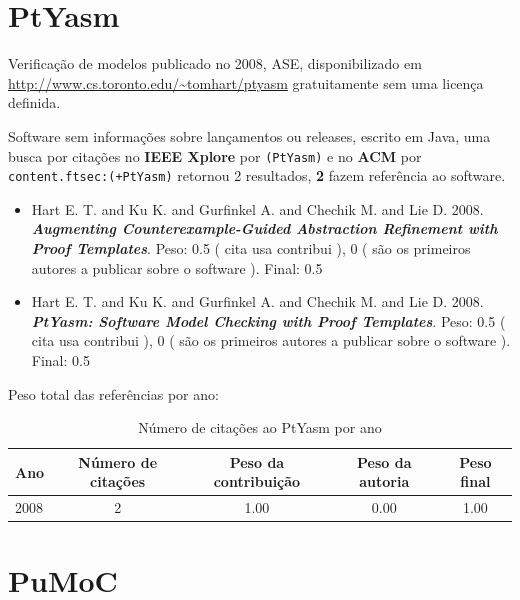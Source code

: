 \section{PtYasm}

Verificação de modelos
publicado no 2008, ASE,
disponibilizado em \url{http://www.cs.toronto.edu/~tomhart/ptyasm}
gratuitamente
sem uma licença definida.

Software sem informações sobre lançamentos ou releases,
escrito em Java,
uma busca por citações no {\bf IEEE Xplore} por
\texttt{(PtYasm)}
e no {\bf ACM} por
\texttt{content.ftsec:(+PtYasm)}
retornou
2 resultados,
{\bf 2} fazem referência ao software.

\begin{itemize}
\item Hart E. T. and Ku K. and Gurfinkel A. and Chechik M. and Lie D.
      2008.
        \textbf{\textit{ Augmenting Counterexample-Guided Abstraction Refinement with Proof Templates}}.
      Peso:
      0.5 (
          cita
          usa
          contribui
      ),
      0 (
são os primeiros autores a publicar sobre o software
      ).
      Final:
      0.5

\item Hart E. T. and Ku K. and Gurfinkel A. and Chechik M. and Lie D.
      2008.
        \textbf{\textit{ PtYasm: Software Model Checking with Proof Templates}}.
      Peso:
      0.5 (
          cita
          usa
          contribui
      ),
      0 (
são os primeiros autores a publicar sobre o software
      ).
      Final:
      0.5

\end{itemize}

Peso total das referências por ano:

\begin{table}[h]
\caption{Número de citações ao PtYasm por ano}
\centering
\begin{tabular}{| l | c | c | c | c |}
  \hline
  Ano & Número de citações & Peso da contribuição & Peso da autoria & Peso final \\
  \hline
  2008
    & 2
    & 1.00
    & 0.00
    & 1.00 \\
  \hline
\end{tabular}
\end{table}


\section{PuMoC}

